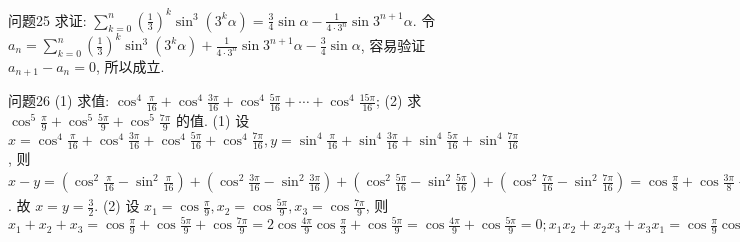 问题25 求证: $\sum_{k=0}^n\left(\frac{1}{3}\right)^k \sin ^3\left(3^k \alpha\right)=\frac{3}{4} \sin \alpha-\frac{1}{4 \cdot 3^n} \sin 3^{n+1} \alpha$.
令 $a_n=\sum_{k=0}^n\left(\frac{1}{3}\right)^k \sin ^3\left(3^k \alpha\right)+\frac{1}{4 \cdot 3^n} \sin 3^{n+1} \alpha-\frac{3}{4} \sin \alpha$, 容易验证 $a_{n+1}-a_n=0$, 所以成立.



问题26 (1) 求值: $\cos ^4 \frac{\pi}{16}+\cos ^4 \frac{3 \pi}{16}+\cos ^4 \frac{5 \pi}{16}+\cdots+\cos ^4 \frac{15 \pi}{16}$;
(2) 求 $\cos ^5 \frac{\pi}{9}+\cos ^5 \frac{5 \pi}{9}+\cos ^5 \frac{7 \pi}{9}$ 的值.
(1) 设 $x=\cos ^4 \frac{\pi}{16}+\cos ^4 \frac{3 \pi}{16}+\cos ^4 \frac{5 \pi}{16}+\cos ^4 \frac{7 \pi}{16}, y=\sin ^4 \frac{\pi}{16}+\sin ^4 \frac{3 \pi}{16}+ \sin ^4 \frac{5 \pi}{16}+\sin ^4 \frac{7 \pi}{16}$, 则 $x-y=\left(\cos ^2 \frac{\pi}{16}-\sin ^2 \frac{\pi}{16}\right)+\left(\cos ^2 \frac{3 \pi}{16}-\sin ^2 \frac{3 \pi}{16}\right)+\left(\cos ^2 \frac{5 \pi}{16}-\right. \left.\sin ^2 \frac{5 \pi}{16}\right)+\left(\cos ^2 \frac{7 \pi}{16}-\sin ^2 \frac{7 \pi}{16}\right)=\cos \frac{\pi}{8}+\cos \frac{3 \pi}{8}+\cos \frac{5 \pi}{8}+\cos \frac{7 \pi}{8}=0 ; x+ y=4-2\left(\cos ^2 \frac{\pi}{16} \sin ^2 \frac{\pi}{16}+\cos ^2 \frac{3 \pi}{16} \sin ^2 \frac{3 \pi}{16}+\cos ^2 \frac{5 \pi}{16} \sin ^2 \frac{5 \pi}{16}+\cos ^2 \frac{7 \pi}{16} \sin ^2 \frac{7 \pi}{16}\right)=4- \frac{1}{2}\left(\sin ^2 \frac{\pi}{8}+\sin ^2 \frac{3 \pi}{8}+\sin ^2 \frac{5 \pi}{8}+\sin ^2 \frac{7 \pi}{8}\right)=4-\left(\sin ^2 \frac{\pi}{8}+\sin ^2 \frac{3 \pi}{8}\right)=4- \left(\frac{1-\cos \frac{\pi}{4}}{2}+\frac{1-\cos \frac{3 \pi}{4}}{2}\right)=3$. 故 $x=y=\frac{3}{2}$. (2) 设 $x_1=\cos \frac{\pi}{9}, x_2= \cos \frac{5 \pi}{9}, x_3=\cos \frac{7 \pi}{9}$, 则 $x_1+x_2+x_3=\cos \frac{\pi}{9}+\cos \frac{5 \pi}{9}+\cos \frac{7 \pi}{9}=2 \cos \frac{4 \pi}{9} \cos \frac{\pi}{3}+ \cos \frac{5 \pi}{9}=\cos \frac{4 \pi}{9}+\cos \frac{5 \pi}{9}=0 ; x_1 x_2+x_2 x_3+x_3 x_1=\cos \frac{\pi}{9} \cos \frac{5 \pi}{9}+\cos \frac{5 \pi}{9}$
